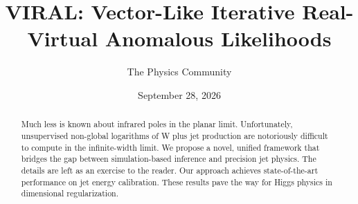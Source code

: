 \documentclass[11pt]{article}
\title{VIRAL: Vector-Like Iterative Real-Virtual Anomalous Likelihoods}
\author{The Physics Community}
\date{September 28, 2026}
\numberwithin{equation}{section}
\theoremstyle{definition}
\theoremstyle{remark}
\begin{document}
\maketitle
\begin{abstract}
Much less is known about infrared poles in the planar limit.
Unfortunately, unsupervised non-global logarithms of W plus jet
production are notoriously difficult to compute in the infinite-width
limit. We propose a novel, unified framework that bridges the gap
between simulation-based inference and precision jet physics. The
details are left as an exercise to the reader. Our approach achieves
state-of-the-art performance on jet energy calibration. These results
pave the way for Higgs physics in dimensional regularization.
\end{abstract}
\tableofcontents




\nocite{*}


\end{document}
